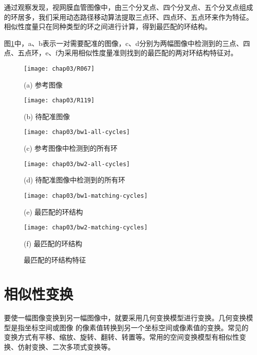 通过观察发现，视网膜血管图像中，由三个分叉点、四个分叉点、五个分叉点组成的环居多，我们采用动态路径移动算法提取三点环、四点环、五点环来作为特征。相似性度量只在同种类型的环之间进行计算，得到最匹配的环结构。

图\ref{fig:matching-pairs}中，a、b表示一对需要配准的图像，c、d分别为两幅图像中检测到的三点、四点、五点环，e、f为采用相似性度量准则找到的最匹配的两对环结构特征对。
\begin{figure}
\centering
\begin{minipage}[b]{0.48\textwidth} 
      \centering 
      \texttt{[image: chap03/R067]}
        \centerline{(a) 参考图像}\medskip
\end{minipage}
  \begin{minipage}[b]{0.48\textwidth}
    \centering
    \texttt{[image: chap03/R119]}
      \centerline{(b) 待配准图像}\medskip
  \end{minipage}
  \begin{minipage}[b]{0.48\textwidth}
    \centering
    \texttt{[image: chap03/bw1-all-cycles]}
      \centerline{(c) 参考图像中检测到的所有环}\medskip
  \end{minipage}
  \begin{minipage}[b]{0.48\textwidth}
    \centering
    \texttt{[image: chap03/bw2-all-cycles]}
      \centerline{(d) 待配准图像中检测到的所有环}\medskip
  \end{minipage}
 \begin{minipage}[b]{0.48\textwidth}
    \centering
      \texttt{[image: chap03/bw1-matching-cycles]}
        \centerline{(e) 最匹配的环结构}\medskip
    \end{minipage}
\begin{minipage}[b]{0.48\textwidth}
	\centering
      \texttt{[image: chap03/bw2-matching-cycles]}
        \centerline{(f) 最匹配的环结构}\medskip
    \end{minipage}
\caption{最匹配的环结构特征}
\label{fig:matching-pairs}
\end{figure}


\section{相似性变换}
\label{}

要使一幅图像变换到另一幅图像中，就要采用几何变换模型进行变换。几何变换模型是指坐标空间或图像 的像素值转换到另一个坐标空间或像素值的变换。常见的变换方式有平移、缩放、旋转、翻转、转置等。常用的空间变换模型有相似性变换、仿射变换、二次多项式变换等。

